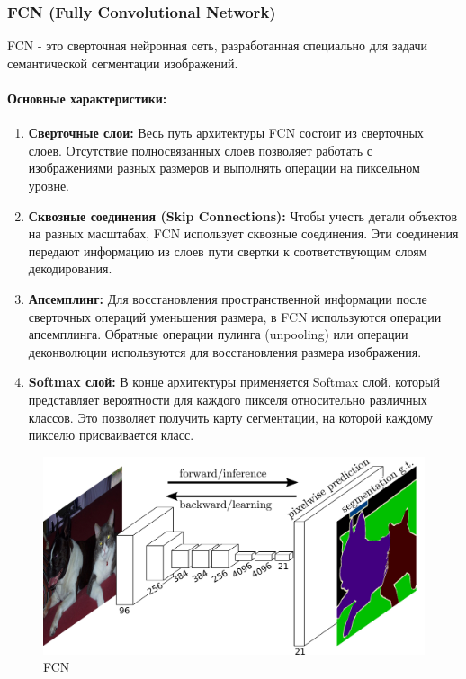 \documentclass[11pt]{article}
\providecommand{\tightlist}{%
      \setlength{\itemsep}{0pt}\setlength{\parskip}{0pt}}
\begin{document}
    \hypertarget{fcn-fully-convolutional-network}{%
\subsubsection{FCN (Fully Convolutional
Network)}\label{fcn-fully-convolutional-network}}

FCN - это сверточная нейронная сеть, разработанная специально для задачи
семантической сегментации изображений.

\hypertarget{ux43eux441ux43dux43eux432ux43dux44bux435-ux445ux430ux440ux430ux43aux442ux435ux440ux438ux441ux442ux438ux43aux438}{%
\paragraph{Основные
характеристики:}\label{ux43eux441ux43dux43eux432ux43dux44bux435-ux445ux430ux440ux430ux43aux442ux435ux440ux438ux441ux442ux438ux43aux438}}

\begin{enumerate}
\def\labelenumi{\arabic{enumi}.}
\tightlist
\item
  \textbf{Сверточные слои:} Весь путь архитектуры FCN состоит из
  сверточных слоев. Отсутствие полносвязанных слоев позволяет работать с
  изображениями разных размеров и выполнять операции на пиксельном
  уровне.
\item
  \textbf{Сквозные соединения (Skip Connections):} Чтобы учесть детали
  объектов на разных масштабах, FCN использует сквозные соединения. Эти
  соединения передают информацию из слоев пути свертки к соответствующим
  слоям декодирования.
\item
  \textbf{Апсемплинг:} Для восстановления пространственной информации
  после сверточных операций уменьшения размера, в FCN используются
  операции апсемплинга. Обратные операции пулинга (unpooling) или
  операции деконволюции используются для восстановления размера
  изображения.
\item
  \textbf{Softmax слой:} В конце архитектуры применяется Softmax слой,
  который представляет вероятности для каждого пикселя относительно
  различных классов. Это позволяет получить карту сегментации, на
  которой каждому пикселю присваивается класс.
\end{enumerate}

\begin{figure}
\centering
\includegraphics{../resources/fcn-architecture.jpg}
\caption{FCN}
\end{figure}
\end{document}
